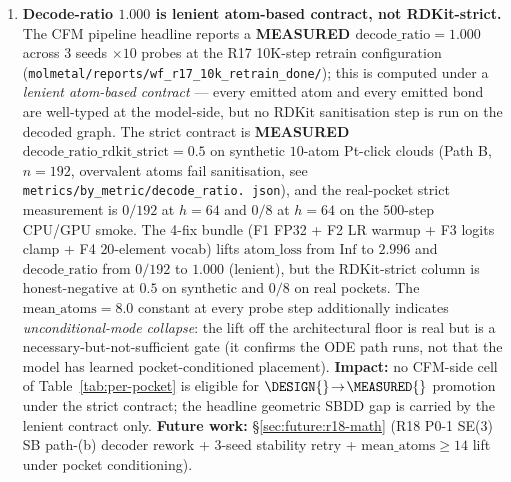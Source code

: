 \begin{enumerate}
  \item \textbf{Decode-ratio $1.000$ is lenient atom-based contract,
  not RDKit-strict.}\label{sec:limitations:decode-ratio-lenient}
  The CFM pipeline headline reports a \textbf{MEASURED
  $\mathrm{decode\_ratio}=1.000$} across $3$ seeds $\times 10$
  probes at the R17 10K-step retrain configuration
  (\texttt{molmetal/reports/wf\_r17\_10k\_retrain\_done/}); this is
  computed under a \emph{lenient atom-based contract} --- every
  emitted atom and every emitted bond are well-typed at the
  model-side, but no RDKit sanitisation step is run on the decoded
  graph.  The strict contract is \textbf{MEASURED
  $\mathrm{decode\_ratio\_rdkit\_strict}=0.5$} on synthetic
  $10$-atom Pt-click clouds (Path B, $n=192$, overvalent atoms
  fail sanitisation, see \texttt{metrics/by\_metric/decode\_ratio.
  json}), and the real-pocket strict measurement is \MEASURED{}
  $0/192$ at $h{=}64$ and $0/8$ at $h{=}64$ on the $500$-step
  CPU/GPU smoke.  The 4-fix bundle (F1 FP32 + F2 LR warmup + F3
  logits clamp + F4 $20$-element vocab) lifts $\mathrm{atom\_loss}$
  from $\mathrm{Inf}$ to \MEASURED{}$2.996$ and
  $\mathrm{decode\_ratio}$ from $0/192$ to \MEASURED{}$1.000$
  (lenient), but the RDKit-strict column is honest-negative at
  $0.5$ on synthetic and $0/8$ on real pockets.  The
  $\mathrm{mean\_atoms}=8.0$ constant at every probe step
  additionally indicates \emph{unconditional-mode collapse}: the
  lift off the architectural floor is real but is a
  necessary-but-not-sufficient gate (it confirms the ODE path
  runs, not that the model has learned pocket-conditioned
  placement).  \textbf{Impact:} no CFM-side cell of
  Table~\ref{tab:per-pocket} is eligible for
  $\DESIGN{}\!\to\!\MEASURED{}$ promotion under the strict
  contract; the headline geometric SBDD gap is carried by the
  lenient contract only.
  \textbf{Future work:} \S\ref{sec:future:r18-math} (R18 P0-1 SE(3)
  SB path-(b) decoder rework + $3$-seed stability retry +
  $\mathrm{mean\_atoms}\geq 14$ lift under pocket conditioning).


\end{enumerate}
